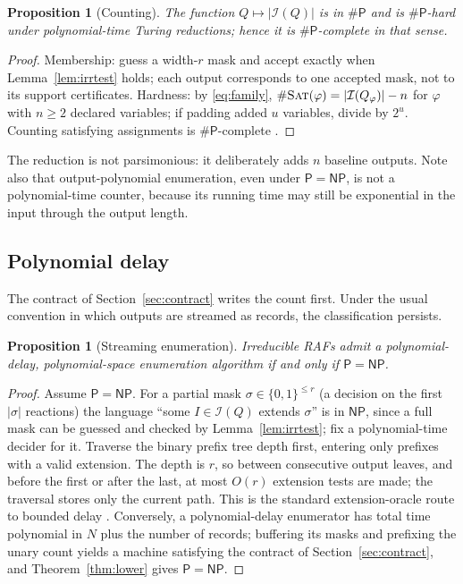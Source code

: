 \documentclass[11pt,a4paper]{article}
\theoremstyle{plain}
\newtheorem{proposition}[theorem]{Proposition}
\theoremstyle{definition}
\theoremstyle{remark}
\newcommand{\Irr}{\mathcal I}
\newcommand{\PP}{\mathsf P}
\newcommand{\NP}{\mathsf{NP}}
\newcommand{\sharpP}{\#\mathsf P}
\newcommand{\SAT}{\textup{\textsc{Sat}}}
\begin{document}
\begin{proposition}[Counting]\label{prop:counting}
The function $Q\mapsto|\Irr(Q)|$ is in $\sharpP$ and is $\sharpP$-hard under polynomial-time Turing reductions; hence it is $\sharpP$-complete in that sense.
\end{proposition}
\begin{proof}
Membership: guess a width-$r$ mask and accept exactly when Lemma~\ref{lem:irrtest} holds; each output corresponds to one accepted mask, not to its support certificates. Hardness: by \eqref{eq:family}, $\#\SAT(\varphi)=|\Irr(Q_\varphi)|-n$ for $\varphi$ with $n\ge2$ declared variables; if padding added $u$ variables, divide by $2^u$. Counting satisfying assignments is $\sharpP$-complete \cite{valiant1979complexity}.
\end{proof}

The reduction is not parsimonious: it deliberately adds $n$ baseline outputs. Note also that output-polynomial enumeration, even under $\PP=\NP$, is not a polynomial-time counter, because its running time may still be exponential in the input through the output length.

\subsection{Polynomial delay}

The contract of Section~\ref{sec:contract} writes the count first. Under the usual convention in which outputs are streamed as records, the classification persists.

\begin{proposition}[Streaming enumeration]\label{prop:delay}
Irreducible RAFs admit a polynomial-delay, polynomial-space enumeration algorithm if and only if $\PP=\NP$.
\end{proposition}
\begin{proof}
Assume $\PP=\NP$. For a partial mask $\sigma\in\{0,1\}^{\le r}$ (a decision on the first $|\sigma|$ reactions) the language ``some $I\in\Irr(Q)$ extends $\sigma$'' is in $\NP$, since a full mask can be guessed and checked by Lemma~\ref{lem:irrtest}; fix a polynomial-time decider for it. Traverse the binary prefix tree depth first, entering only prefixes with a valid extension. The depth is $r$, so between consecutive output leaves, and before the first or after the last, at most $O(r)$ extension tests are made; the traversal stores only the current path. This is the standard extension-oracle route to bounded delay \cite[Section~4]{strozecki2023enumeration}. Conversely, a polynomial-delay enumerator has total time polynomial in $N$ plus the number of records; buffering its masks and prefixing the unary count yields a machine satisfying the contract of Section~\ref{sec:contract}, and Theorem~\ref{thm:lower} gives $\PP=\NP$.
\end{proof}
\end{document}
